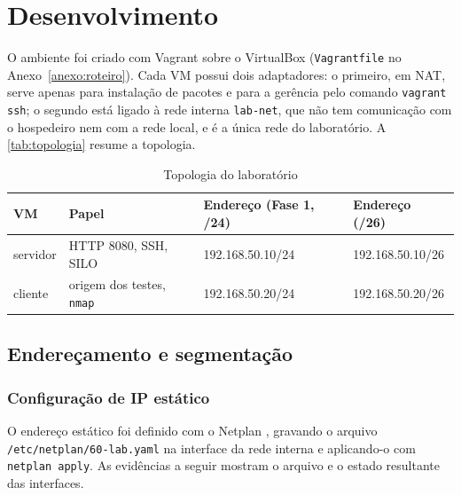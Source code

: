 \chapter{Desenvolvimento}\label{cap:desenvolvimento}

O ambiente foi criado com Vagrant sobre o VirtualBox (\texttt{Vagrantfile} no
Anexo~\ref{anexo:roteiro}). Cada VM possui dois adaptadores: o primeiro, em NAT, serve
apenas para instalação de pacotes e para a gerência pelo comando \texttt{vagrant ssh}; o
segundo está ligado à rede interna \texttt{lab-net}, que não tem comunicação com o
hospedeiro nem com a rede local, e é a única rede do laboratório. A
\autoref{tab:topologia} resume a topologia.

\begin{table}[htbp]
  \centering
  \caption{Topologia do laboratório}\label{tab:topologia}
  \begin{tabular}{llll}
    \hline
    \textbf{VM} & \textbf{Papel} & \textbf{Endereço (Fase 1, /24)} & \textbf{Endereço (/26)} \\
    \hline
    servidor & HTTP 8080, SSH, SILO & 192.168.50.10/24 & 192.168.50.10/26 \\
    cliente  & origem dos testes, \texttt{nmap} & 192.168.50.20/24 & 192.168.50.20/26 \\
    \hline
  \end{tabular}
\end{table}

\section{Endereçamento e segmentação}\label{sec:enderecamento}

\subsection{Configuração de IP estático}

O endereço estático foi definido com o Netplan \cite{netplan-docs}, gravando o arquivo
\texttt{/etc/netplan/60-lab.yaml} na interface da rede interna e aplicando-o com
\texttt{netplan apply}. As evidências a seguir mostram o arquivo e o estado resultante
das interfaces.


